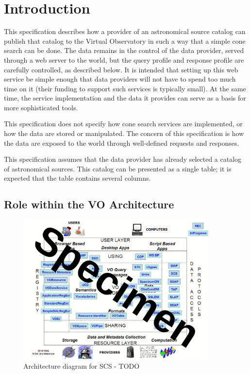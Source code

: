 \documentclass[11pt,a4paper]{ivoa}
\begin{document}
\section{Introduction}

This specification describes how a provider of an astronomical source catalog can publish that catalog to the Virtual Observatory in such a way that a simple cone search can be done. The data remains in the control of the data provider, served through a web server to the world, but the query profile and response profile are carefully controlled, as described below. It is intended that setting up this web service be simple enough that data providers will not have to spend too much time on it (their funding to support such services is typically small). At the same time, the service implementation and the data it provides can serve as a basis for more sophisticated tools.

This specification does not specify how cone search services are implemented, or how the data are stored or manipulated. The concern of this specification is how the data are exposed to the world through well-defined requests and responses.

This specification assumes that the data provider has already selected a catalog of astronomical sources. This catalog can be presented as a single table; it is expected that the table contains several columns.

\subsection{Role within the VO Architecture}

\begin{figure}
\centering


\includegraphics[width=0.9\textwidth]{archdiag.png}
\caption{Architecture diagram for SCS - TODO}
\label{fig:archdiag}
\end{figure}
\end{document}
